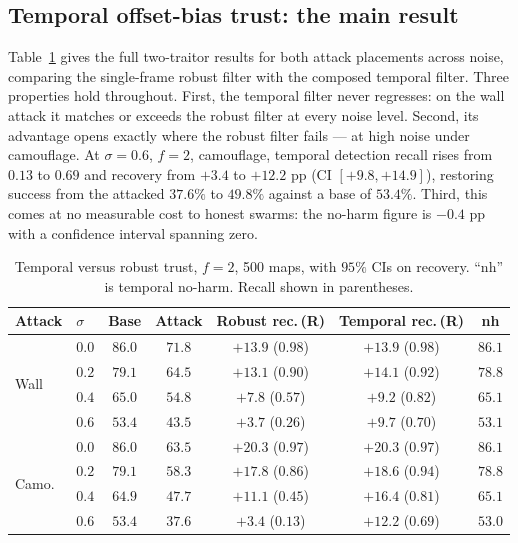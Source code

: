 \subsection{Temporal offset-bias trust: the main result}\label{sec:res-temporal}
Table~\ref{tab:temporal} gives the full two-traitor results for both attack
placements across noise, comparing the single-frame robust filter with the
composed temporal filter. Three properties hold throughout. First, the
temporal filter never regresses: on the wall attack it matches or exceeds
the robust filter at every noise level. Second, its advantage opens exactly
where the robust filter fails --- at high noise under camouflage. At
$\sigma=0.6$, $f=2$, camouflage, temporal detection recall rises from
$0.13$ to $0.69$ and recovery from $+3.4$ to $+12.2$ pp
(CI $[+9.8,+14.9]$), restoring success from the attacked $37.6\%$ to
$49.8\%$ against a base of $53.4\%$. Third, this comes at no measurable cost
to honest swarms: the no-harm figure is $-0.4$ pp with a confidence
interval spanning zero.

\begin{table}[t]\centering
\caption{Temporal versus robust trust, $f=2$, 500 maps, with $95\%$ CIs on
recovery. ``nh'' is temporal no-harm. Recall shown in parentheses.}
\label{tab:temporal}
\begin{tabular}{llccccc}
\toprule
Attack & $\sigma$ & Base & Attack & Robust rec.\,(R) & Temporal rec.\,(R) & nh\\
\midrule
\multirow{4}{*}{Wall}
 & $0.0$ & $86.0$ & $71.8$ & $+13.9$ ($0.98$) & $+13.9$ ($0.98$) & $86.1$\\
 & $0.2$ & $79.1$ & $64.5$ & $+13.1$ ($0.90$) & $+14.1$ ($0.92$) & $78.8$\\
 & $0.4$ & $65.0$ & $54.8$ & $+7.8$ ($0.57$)  & $+9.2$ ($0.82$)  & $65.1$\\
 & $0.6$ & $53.4$ & $43.5$ & $+3.7$ ($0.26$)  & $+9.7$ ($0.70$)  & $53.1$\\
\midrule
\multirow{4}{*}{Camo.}
 & $0.0$ & $86.0$ & $63.5$ & $+20.3$ ($0.97$) & $+20.3$ ($0.97$) & $86.1$\\
 & $0.2$ & $79.1$ & $58.3$ & $+17.8$ ($0.86$) & $+18.6$ ($0.94$) & $78.8$\\
 & $0.4$ & $64.9$ & $47.7$ & $+11.1$ ($0.45$) & $+16.4$ ($0.81$) & $65.1$\\
 & $0.6$ & $53.4$ & $37.6$ & $+3.4$ ($0.13$)  & $\mathbf{+12.2}$ ($0.69$) & $53.0$\\
\bottomrule
\end{tabular}
\end{table}

